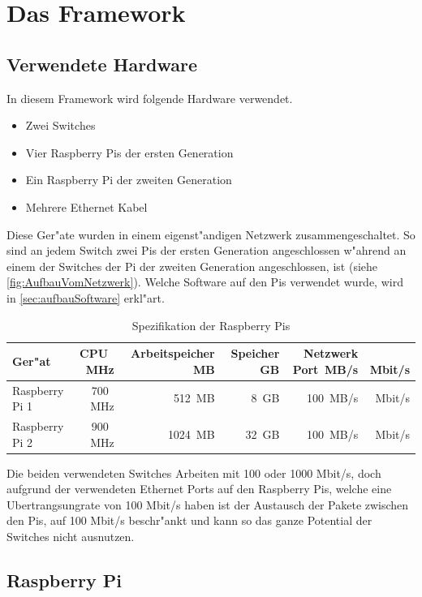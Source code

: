 \chapter{Das Framework}
\label{cha:framework}
\section{Verwendete Hardware} \label{sec:verwendeteHardware}

In diesem Framework wird folgende Hardware verwendet.

\begin{itemize}
\item Zwei Switches
\item Vier Raspberry Pis der ersten Generation
\item Ein Raspberry Pi der zweiten Generation
\item Mehrere Ethernet Kabel
\end{itemize}

Diese Ger"ate wurden in einem eigenst"andigen Netzwerk zusammengeschaltet. So sind an jedem Switch zwei Pis %
der ersten Generation angeschlossen w"ahrend an einem der Switches der Pi der zweiten Generation angeschlossen, %
ist (siehe \cref{fig:AufbauVomNetzwerk}). Welche Software auf den Pis verwendet wurde, wird in \cref{sec:aufbauSoftware} erkl"art. 

\begin{table}
\centering
\begin{tabular}{l%
 r<{\,MHz}%
 r<{\,MB}%
 r<{\,GB}%
 r<{\,MB/s}%
 r<{\,Mbit/s}%
}
Ger"at 		& CPU	& Arbeitspeicher	& Speicher	& Netzwerk Port	\\
\hline
Raspberry Pi 1	& 700	& 512			& 8		& 100		\\
Raspberry Pi 2 	& 900 	& 1024			& 32		& 100		\\

\end{tabular}
\caption{Spezifikation der Raspberry Pis}
\label{tab:hardwarespezifiktion}
\end{table}


Die beiden verwendeten Switches Arbeiten mit 100 oder 1000 Mbit/s, doch aufgrund %
der verwendeten Ethernet Ports auf den Raspberry Pis, welche eine Ubertrangsungrate von 100 Mbit/s haben %
ist der Austausch der Pakete zwischen den Pis, auf 100 Mbit/s beschr"ankt und kann so das ganze Potential der %
Switches nicht ausnutzen. %

\section{Raspberry Pi}

